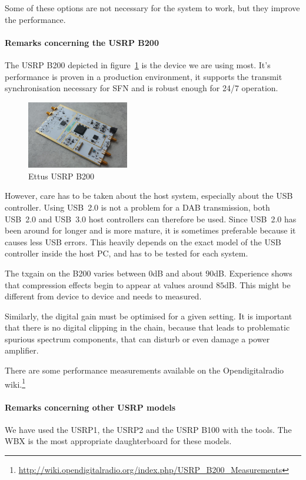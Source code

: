 Some of these options are not necessary for the system to work, but they
improve the performance.

\paragraph{Remarks concerning the USRP B200}
\label{usrp_b200}
The USRP B200 depicted in figure~\ref{fig:usrp-b200} is the device we are using
most. It's performance is proven in a production environment, it supports the
transmit synchronisation necessary for SFN and is robust enough for 24/7
operation.

\begin{figure}
    \centering
    \includegraphics[width=12em]{figures/USRP-B200.jpg}
    \caption{Ettus USRP B200}
    \label{fig:usrp-b200}
\end{figure}


However, care has to be taken about the host system, especially about the USB
controller. Using USB~2.0 is not a problem for a DAB transmission, both USB~2.0
and USB~3.0 host controllers can therefore be used. Since USB~2.0 has been
around for longer and is more mature, it is sometimes preferable because it
causes less USB errors. This heavily depends on the exact model of the USB
controller inside the host PC, and has to be tested for each system.

The txgain on the B200 varies between $0$dB and about $90$dB. Experience shows
that compression effects begin to appear at values around $85$dB. This might be
different from device to device and needs to measured.

Similarly, the digital gain must be optimised for a given setting. It is
important that there is no digital clipping in the chain, because that leads to
problematic spurious spectrum components, that can disturb or even damage a
power amplifier.

There are some performance measurements available on the Opendigitalradio
wiki.\footnote{\url{http://wiki.opendigitalradio.org/index.php/USRP\_B200\_Measurements}}

\paragraph{Remarks concerning other USRP models}
We have used the USRP1, the USRP2 and the USRP B100 with the tools. The WBX is
the most appropriate daughterboard for these models.

